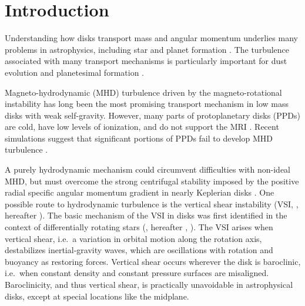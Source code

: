 \documentclass[iop, numberedappendix]{emulateapj}
\begin{document}
\section{Introduction}\label{intro}
Understanding how disks transport mass and angular momentum underlies 
many problems in astrophysics, including star and planet formation  
\citep[][]{armitage10}.  The turbulence associated with many transport mechanisms
is particularly important for dust evolution and planetesimal formation \citep{yl07, chiang10}. 

Magneto-hydrodynamic (MHD) turbulence driven by
the magneto-rotational instability \citep[MRI,][]{balbus91} has long been the most
promising transport mechanism in low mass disks with weak self-gravity. 
However, many parts of protoplanetary  
disks (PPDs) are cold, have low levels of ionization, and do not support the MRI 
\citep{blaes94,salmeron03}. Recent simulations
suggest that significant portions of PPDs fail to develop MHD
turbulence \citep[e.g.][]{simon13, lesur14,bai15,gressel15}. 

A purely hydrodynamic mechanism could circumvent difficulties with non-ideal MHD, but must overcome
the strong centrifugal stability imposed by the positive radial specific angular
momentum gradient in nearly Keplerian disks \citep{balbus96}.
One possible route to hydrodynamic turbulence is the vertical shear
instability (VSI, \citealp{urpin98, urpin03, nelson13}, hereafter ).  The
basic mechanism of the VSI  in disks was first 
identified in the context of differentially rotating stars (\citealp{goldreich67}, hereafter , \citealp{fricke68}).   
The VSI arises when vertical shear, i.e.\ a variation in orbital motion along the rotation axis, 
destabilizes inertial-gravity waves, which are oscillations 
with rotation and buoyancy as restoring forces. Vertical shear
occurs wherever the disk is baroclinic, i.e.\ when constant 
density and constant pressure surfaces are misaligned.  Baroclinicity, and thus vertical shear, is 
practically unavoidable in astrophysical disks, except at special locations like the
midplane. 
\end{document}
